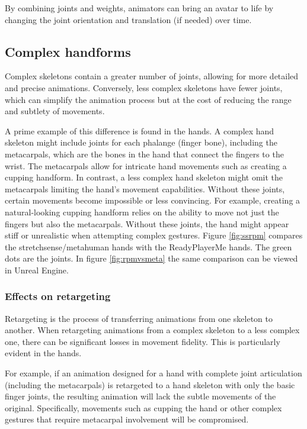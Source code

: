 \documentclass{uva-inf-article}
\begin{document}
By combining joints and weights, animators can bring an avatar to life by changing the joint orientation and translation (if needed) over time.



\subsection{Complex handforms}
Complex skeletons contain a greater number of joints, allowing for more detailed and precise animations. Conversely, less complex skeletons have fewer joints, which can simplify the animation process but at the cost of reducing the range and subtlety of movements.

A prime example of this difference is found in the hands. A complex hand skeleton might include joints for each phalange (finger bone), including the metacarpals, which are the bones in the hand that connect the fingers to the wrist. The metacarpals allow for intricate hand movements such as creating a cupping handform. In contrast, a less complex hand skeleton might omit the metacarpals limiting the hand's movement capabilities. Without these joints, certain movements become impossible or less convincing. For example, creating a natural-looking cupping handform relies on the ability to move not just the fingers but also the metacarpals. Without these joints, the hand might appear stiff or unrealistic when attempting complex gestures. Figure \ref{fig:ssrpm} compares the stretchsense/metahuman hands with the ReadyPlayerMe hands. The green dots are the joints. In figure \ref{fig:rpmvsmeta} the same comparison can be viewed in Unreal Engine.

\subsubsection{Effects on retargeting}
Retargeting is the process of transferring animations from one skeleton to another. When retargeting animations from a complex skeleton to a less complex one, there can be significant losses in movement fidelity. This is particularly evident in the hands.

For example, if an animation designed for a hand with complete joint articulation (including the metacarpals) is retargeted to a hand skeleton with only the basic finger joints, the resulting animation will lack the subtle movements of the original. Specifically, movements such as cupping the hand or other complex gestures that require metacarpal involvement will be compromised.
\end{document}
